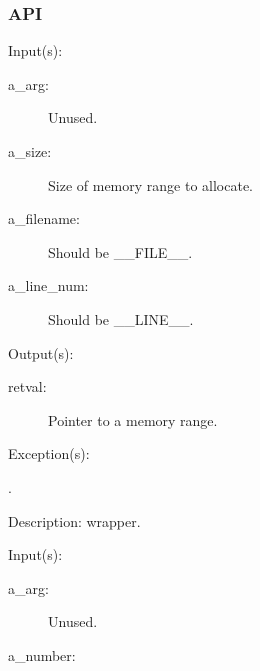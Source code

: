 \subsubsection{API}
\begin{capi}
\label{nxa_malloc_e}
\label{nxa_malloc}
	\begin{capilist}
	\item[Input(s): ]
		\begin{description}\item[]
		\item[a\_arg: ]
			Unused.
		\item[a\_size: ]
			Size of memory range to allocate.
		\item[a\_filename: ]
			Should be \_\_FILE\_\_.
		\item[a\_line\_num: ]
			Should be \_\_LINE\_\_.
		\end{description}
	\item[Output(s): ]
		\begin{description}\item[]
		\item[retval: ]
			Pointer to a memory range.
		\end{description}
	\item[Exception(s): ]
		\begin{description}\item[]
		\item[.]
		\end{description}
	\item[Description: ]
		 wrapper.
	\end{capilist}
\label{nxa_calloc_e}
\label{nxa_calloc}
	\begin{capilist}
	\item[Input(s): ]
		\begin{description}\item[]
		\item[a\_arg: ]
			Unused.
		\item[a\_number: ]

\end{description}
\end{capilist}
\end{capi}
